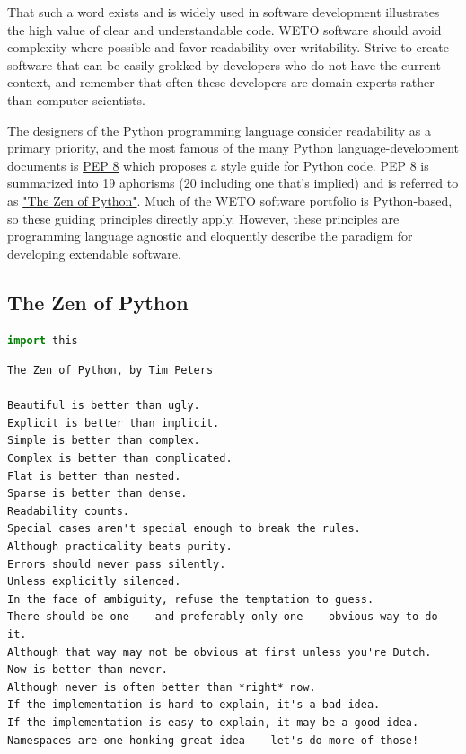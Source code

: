 \documentclass[]{nrel}
\begin{document}
That such a word exists and is widely used in software development illustrates the high value
of clear and understandable code.
WETO software should avoid complexity where possible and favor readability over writability.
Strive to create software that can be easily grokked by developers who do not have the current
context, and remember that often these developers are domain experts rather than
computer scientists.

The designers of the Python programming language consider readability as a primary priority, and
the most famous of the many Python language-development documents is
\href{https://peps.python.org/pep-0008/}{PEP 8} which proposes a style guide for Python code.
PEP 8 is summarized into 19 aphorisms (20 including one that’s implied) and is referred to as
\href{https://peps.python.org/pep-0020/}{"The Zen of Python"}. Much of the WETO software portfolio is
Python-based, so these guiding principles directly apply. However, these principles are
programming language agnostic and eloquently describe the paradigm for developing
extendable software.


\subsection{The Zen of Python}
\label{sec:zen}

\begin{lstlisting}[language=Python]
import this
\end{lstlisting}

\begin{lstlisting}
The Zen of Python, by Tim Peters

Beautiful is better than ugly.
Explicit is better than implicit.
Simple is better than complex.
Complex is better than complicated.
Flat is better than nested.
Sparse is better than dense.
Readability counts.
Special cases aren't special enough to break the rules.
Although practicality beats purity.
Errors should never pass silently.
Unless explicitly silenced.
In the face of ambiguity, refuse the temptation to guess.
There should be one -- and preferably only one -- obvious way to do it.
Although that way may not be obvious at first unless you're Dutch.
Now is better than never.
Although never is often better than *right* now.
If the implementation is hard to explain, it's a bad idea.
If the implementation is easy to explain, it may be a good idea.
Namespaces are one honking great idea -- let's do more of those!
\end{lstlisting}
\end{document}
